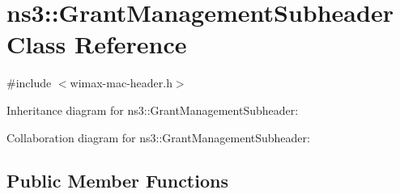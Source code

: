 \hypertarget{classns3_1_1GrantManagementSubheader}{}\section{ns3\+:\+:Grant\+Management\+Subheader Class Reference}
\label{classns3_1_1GrantManagementSubheader}


{\ttfamily \#include $<$wimax-\/mac-\/header.\+h$>$}



Inheritance diagram for ns3\+:\+:Grant\+Management\+Subheader\+:


Collaboration diagram for ns3\+:\+:Grant\+Management\+Subheader\+:
\subsection*{Public Member Functions}
